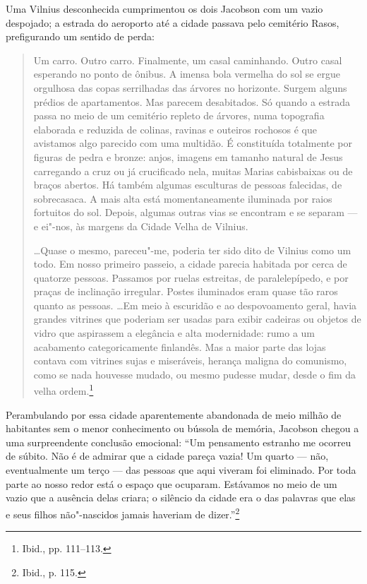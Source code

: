 Uma Vilnius desconhecida cumprimentou os dois Jacobson com um vazio
despojado; a estrada do aeroporto até a cidade passava pelo cemitério
Rasos, prefigurando um sentido de perda:

\begin{quote}
Um carro. Outro carro. Finalmente, um casal caminhando. Outro casal
esperando no ponto de ônibus. A imensa bola vermelha do sol se ergue
orgulhosa das copas serrilhadas das árvores no horizonte. Surgem alguns
prédios de apartamentos. Mas parecem desabitados. Só quando a estrada
passa no meio de um cemitério repleto de árvores, numa topografia
elaborada e reduzida de colinas, ravinas e outeiros rochosos é que
avistamos algo parecido com uma multidão. É constituída totalmente por
figuras de pedra e bronze: anjos, imagens em tamanho natural de Jesus
carregando a cruz ou já crucificado nela, muitas Marias cabisbaixas ou
de braços abertos. Há também algumas esculturas de pessoas falecidas, de
sobrecasaca. A mais alta está momentaneamente iluminada por raios
fortuitos do sol. Depois, algumas outras vias se encontram e se separam
--- e ei"-nos, às margens da Cidade Velha de Vilnius.

\ldots{}Quase o mesmo, pareceu"-me, poderia ter sido dito de Vilnius como
um todo. Em nosso primeiro passeio, a cidade parecia habitada por cerca
de quatorze pessoas. Passamos por ruelas estreitas, de paralelepípedo, e
por praças de inclinação irregular. Postes iluminados eram quase tão
raros quanto as pessoas. \ldots{}Em meio à escuridão e ao despovoamento
geral, havia grandes vitrines que poderiam ser usadas para exibir
cadeiras ou objetos de vidro que aspirassem a elegância e alta
modernidade: rumo a um acabamento categoricamente finlandês. Mas a maior
parte das lojas contava com vitrines sujas e miseráveis, herança maligna
do comunismo, como se nada houvesse mudado, ou mesmo pudesse mudar,
desde o fim da velha ordem.\footnote{Ibid., pp. 111--113.}
\end{quote}

Perambulando por essa cidade aparentemente abandonada de meio milhão de
habitantes sem o menor conhecimento ou bússola de memória, Jacobson
chegou a uma surpreendente conclusão emocional: ``Um pensamento estranho
me ocorreu de súbito. Não é de admirar que a cidade pareça vazia! Um
quarto --- não, eventualmente um terço --- das pessoas que aqui viveram foi
eliminado. Por toda parte ao nosso redor está o espaço que ocuparam.
Estávamos no meio de um vazio que a ausência delas criara; o silêncio da
cidade era o das palavras que elas e seus filhos não"-nascidos jamais
haveriam de dizer.''\footnote{Ibid., p. 115.}


